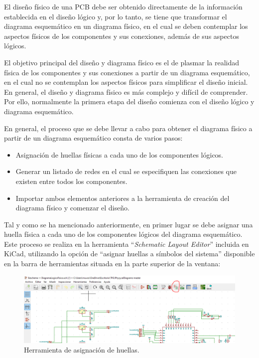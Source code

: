 El diseño físico de una \ac{PCB} debe ser obtenido directamente de la información establecida en el diseño lógico y, por lo tanto, se tiene que transformar el diagrama esquemático en un diagrama físico, en el cual se deben contemplar los aspectos físicos de los componentes y sus conexiones, además de sus aspectos lógicos.

El objetivo principal del diseño y diagrama físico es el de plasmar la realidad física de los componentes y sus conexiones a partir de un diagrama esquemático, en el cual no se contemplan los aspectos físicos para simplificar el diseño inicial. En general, el diseño y diagrama físico es más complejo y difícil de comprender. Por ello, normalmente la primera etapa del diseño comienza con el diseño lógico y diagrama esquemático.

En general, el proceso que se debe llevar a cabo para obtener el diagrama físico a partir de un diagrama esquemático consta de varios pasos:
\begin{itemize}
    \item Asignación de huellas físicas a cada uno de los componentes lógicos.
    \item Generar un listado de redes en el cual se especifiquen las conexiones que existen entre todos los componentes.
    \item Importar ambos elementos anteriores a la herramienta de creación del diagrama físico y comenzar el diseño.
\end{itemize}

Tal y como se ha mencionado anteriormente, en primer lugar se debe asignar una huella física a cada uno de los componentes lógicos del diagrama esquemático. Este proceso se realiza en la herramienta ``\textit{Schematic Layout Editor}'' incluida en KiCad, utilizando la opción de ``asignar huellas a símbolos del sistema'' disponible en la barra de herramientas situada en la parte superior de la ventana:

\begin{figure}[H]
\centering 
\includegraphics[width=\linewidth]{pictures/HerramientaHuellas.PNG}
\caption{Herramienta de asignación de huellas.}
\label{fig:Herramienta_Huellas}
\end{figure}

